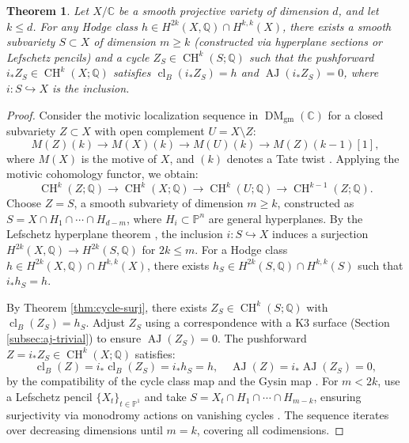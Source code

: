 \documentclass[11pt]{article}
\newtheorem{theorem}{Theorem}[section]
\DeclareMathOperator{\cl}{cl}
\DeclareMathOperator{\CH}{CH}
\DeclareMathOperator{\AJ}{AJ}
\DeclareMathOperator{\DM}{DM}
\begin{document}
\begin{theorem}\label{thm:motivic-localization}
Let \(X/\mathbb{C}\) be a smooth projective variety of dimension \(d\), and let \(k \leq d\). For any Hodge class \(h \in H^{2k}(X, \mathbb{Q}) \cap H^{k,k}(X)\), there exists a smooth subvariety \(S \subset X\) of dimension \(m \geq k\) (constructed via hyperplane sections or Lefschetz pencils) and a cycle \(Z_S \in \CH^k(S; \mathbb{Q})\) such that the pushforward \(i_* Z_S \in \CH^k(X; \mathbb{Q})\) satisfies \(\cl_B(i_* Z_S) = h\) and \(\AJ(i_* Z_S) = 0\), where \(i: S \hookrightarrow X\) is the inclusion.
\end{theorem}

\begin{proof}
Consider the motivic localization sequence in \(\DM_{\mathrm{gm}}(\mathbb{C})\) for a closed subvariety \(Z \subset X\) with open complement \(U = X \setminus Z\):
\[
M(Z)(k) \to M(X)(k) \to M(U)(k) \to M(Z)(k-1)[1],
\]
where \(M(X)\) is the motive of \(X\), and \((k)\) denotes a Tate twist \cite{voevodsky2000}. Applying the motivic cohomology functor, we obtain:
\[
\CH^k(Z; \mathbb{Q}) \to \CH^k(X; \mathbb{Q}) \to \CH^k(U; \mathbb{Q}) \to \CH^{k-1}(Z; \mathbb{Q}).
\]
Choose \(Z = S\), a smooth subvariety of dimension \(m \geq k\), constructed as \(S = X \cap H_1 \cap \cdots \cap H_{d-m}\), where \(H_i \subset \mathbb{P}^n\) are general hyperplanes. By the Lefschetz hyperplane theorem \cite{griffiths1969}, the inclusion \(i: S \hookrightarrow X\) induces a surjection \(H^{2k}(X, \mathbb{Q}) \to H^{2k}(S, \mathbb{Q})\) for \(2k \leq m\). For a Hodge class \(h \in H^{2k}(X, \mathbb{Q}) \cap H^{k,k}(X)\), there exists \(h_S \in H^{2k}(S, \mathbb{Q}) \cap H^{k,k}(S)\) such that \(i_* h_S = h\).

By Theorem \ref{thm:cycle-surj}, there exists \(Z_S \in \CH^k(S; \mathbb{Q})\) with \(\cl_B(Z_S) = h_S\). Adjust \(Z_S\) using a correspondence with a K3 surface (Section \ref{subsec:aj-trivial}) to ensure \(\AJ(Z_S) = 0\). The pushforward \(Z = i_* Z_S \in \CH^k(X; \mathbb{Q})\) satisfies:
\[
\cl_B(Z) = i_* \cl_B(Z_S) = i_* h_S = h, \quad \AJ(Z) = i_* \AJ(Z_S) = 0,
\]
by the compatibility of the cycle class map and the Gysin map \cite{fulton1984}. For \(m < 2k\), use a Lefschetz pencil \(\{X_t\}_{t \in \mathbb{P}^1}\) and take \(S = X_t \cap H_1 \cap \cdots \cap H_{m-k}\), ensuring surjectivity via monodromy actions on vanishing cycles \cite{voisin2002}. The sequence iterates over decreasing dimensions until \(m = k\), covering all codimensions.
\end{proof}
\end{document}
